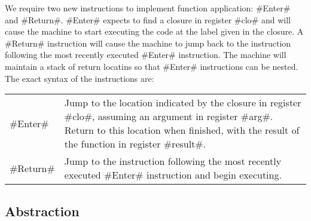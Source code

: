 \documentclass[12pt]{report}
\begin{document}
We require two new instructions to implement function application:
#Enter# and #Return#. #Enter# expects to find a closure in register
#clo# and will cause the machine to start executing the code at the
label given in the closure. A #Return# instruction will cause the machine
to jump back to the instruction following the most recently executed 
#Enter# instruction. The machine will maintain a stack of return locatins
so that #Enter# instructions can be nested. The exact syntax of the
instructions are:
\begin{center}
  \begin{tabular}{lp{4in}}
    #Enter# & Jump to the location indicated by the closure in
    register #clo#, assuming an argument in register #arg#. Return to
    this location when finished, with the result of the function in
    register #result#. \\
    #Return# & Jump to the instruction following the most recently 
    executed #Enter# instruction and begin executing. 
  \end{tabular}
\end{center}

\subsection{Abstraction}








\end{document}
